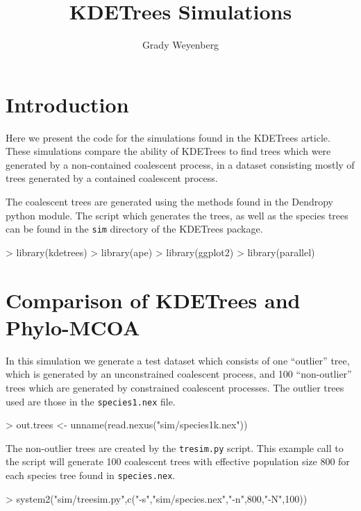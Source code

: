 \documentclass{article}
\title{KDETrees Simulations}
\author{Grady Weyenberg}
\begin{document}
\maketitle
\section{Introduction}
\label{sec:introduction}
Here we present the code for the simulations found in the KDETrees
article. These simulations compare the ability of KDETrees to find
trees which were generated by a non-contained coalescent process, in a
dataset consisting mostly of trees generated by a contained coalescent
process.

The coalescent trees are generated using the methods found in the
Dendropy python module. The script which generates the trees, as well
as the species trees can be found in the {\tt sim} directory of the
KDETrees package.

\begin{Schunk}
\begin{Sinput}
> library(kdetrees)
> library(ape)
> library(ggplot2)
> library(parallel)
\end{Sinput}
\end{Schunk}

\section{Comparison of KDETrees and Phylo-MCOA}
\label{sec:comp-kdetr-phylo}
In this simulation we generate a test dataset which consists of one
``outlier'' tree, which is generated by an unconstrained coalescent
process, and 100 ``non-outlier'' trees which are generated by
constrained coalescent processes. The outlier trees used are those in
the {\tt species1.nex} file.
\begin{Schunk}
\begin{Sinput}
> out.trees <- unname(read.nexus("sim/species1k.nex"))
\end{Sinput}
\end{Schunk}
The non-outlier trees are created by the {\tt tresim.py} script.
This example call to the script will generate 100 coalescent trees
with effective population size 800 for each species tree found in
{\tt species.nex}.
\begin{Schunk}
\begin{Sinput}
> system2("sim/treesim.py",c("-s","sim/species.nex","-n",800,"-N",100))
\end{Sinput}
\end{Schunk}
\end{document}
